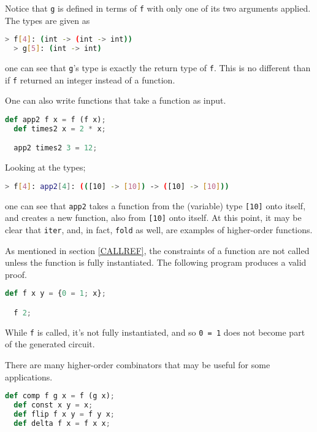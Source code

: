 Notice that \lstinline{g} is defined in terms of \lstinline{f} with only one of its two arguments applied. The types are given as

\begin{lstlisting}[language=bash]
  > f[4]: (int -> (int -> int))
  > g[5]: (int -> int)
\end{lstlisting}

one can see that \lstinline{g}'s type is exactly the return type of \lstinline{f}. This is no different than if \lstinline{f} returned an integer instead of a function.

One can also write functions that take a function as input.

\begin{lstlisting}[language=Python]
  def app2 f x = f (f x);
  def times2 x = 2 * x;

  app2 times2 3 = 12;
\end{lstlisting}

Looking at the types;

\begin{lstlisting}[language=bash]
  > f[4]: app2[4]: (([10] -> [10]) -> ([10] -> [10]))
\end{lstlisting}

one can see that \lstinline{app2} takes a function from the (variable) type \lstinline{[10]} onto itself, and creates a new function, also from \lstinline{[10]} onto itself. At this point, it may be clear that \lstinline{iter}, and, in fact, \lstinline{fold} as well, are examples of higher-order functions.

As mentioned in section \ref{CALLREF}, the constraints of a function are not called unless the function is fully instantiated. The following program produces a valid proof.

\begin{lstlisting}[language=Python]
  def f x y = {0 = 1; x};

  f 2;
\end{lstlisting}

While \lstinline{f} is called, it's not fully instantiated, and so \lstinline{0 = 1} does not become part of the generated circuit.

There are many higher-order combinators that may be useful for some applications.

\begin{lstlisting}[language=Python]
  def comp f g x = f (g x);
  def const x y = x;
  def flip f x y = f y x;
  def delta f x = f x x;
\end{lstlisting}

